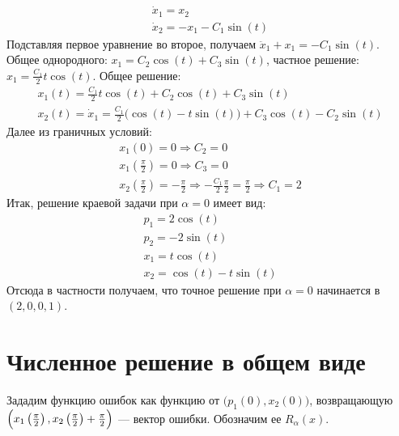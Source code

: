 \documentclass{article}
\begin{document}
\begin{gather*}
  \dot x_{1} = x_{2}\\
  \dot x_{2} = -x_{1} - C_{1}\sin(t)
\end{gather*}
Подставляя первое уравнение во второе, получаем
$\ddot x_{1} + x_{1} = -C_{1}\sin(t)$. Общее однородного:
$x_{1} = C_{2}\cos(t) + C_{3}\sin(t)$, частное решение:
$x_{1} = \frac {C_{1}}{2} t \cos(t)$. Общее решение:
\begin{gather*}
  x_{1}(t) = \frac {C_{1}}{2} t \cos(t) + C_{2}\cos(t) + C_{3}\sin(t)\\
  x_{2}(t) =\dot x_{1} = \frac {C_{1}}{2} \big(\cos(t) -
  t\sin(t)\big) + C_{3}\cos(t) - C_{2}\sin(t)
\end{gather*}
Далее из граничных условий:
\begin{gather*}
  x_{1}(0) = 0 \Rightarrow C_{2} = 0\\
  x_{1}\left(\frac \pi 2\right) = 0 \Rightarrow C_{3} = 0\\
  x_{2}\left(\frac \pi 2\right) = -\frac \pi 2 \Rightarrow
  -\frac{C_{1}}{2}\frac{\pi}2 = \frac \pi 2 \Rightarrow C_{1} = 2
\end{gather*}
Итак, решение краевой задачи при $\alpha = 0$ имеет вид:
\begin{gather*}
  p_{1} = 2\cos(t)\\
  p_{2} = -2\sin(t)\\
  x_{1} = t\cos(t)\\
  x_{2} = \cos(t) - t\sin(t)
\end{gather*}
Отсюда в частности получаем, что точное решение при $\alpha = 0$
начинается в $(2, 0, 0, 1)$.
\section{Численное решение в общем виде}
Зададим функцию ошибок как функцию от $\big(p_{1}(0), x_{2}(0)\big)$,
возвращающую
$\Bigl(x_{1}\left(\frac \pi 2\right), x_{2}\left(\frac \pi 2\right) +
\frac \pi 2\Bigr)$ --- вектор
ошибки. Обозначим ее $R_{\alpha}(x)$.
\end{document}

